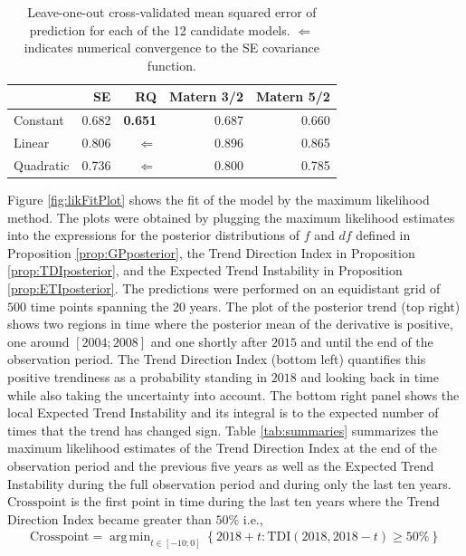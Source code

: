 \documentclass[
  11pt,
]{article}
\theoremstyle{nonumberplain}
\begin{document}
\begin{table}[htbp]
\center
\begin{tabular}{l|rrrr}
 & SE & RQ & Matern 3/2 & Matern 5/2\\ \hline
Constant & 0.682 & \textbf{0.651} & 0.687 & 0.660\\
Linear & 0.806 & $\Leftarrow    $ & 0.896 & 0.865\\
Quadratic & 0.736 & $\Leftarrow$ & 0.800 & 0.785
\end{tabular}
\caption{Leave-one-out cross-validated mean squared error of prediction for each of the 12 candidate models. $\Leftarrow$ indicates numerical convergence to the SE covariance function.}
\label{tab:looTale}
\end{table}

Figure \ref{fig:likFitPlot} shows the fit of the model by the maximum
likelihood method. The plots were obtained by plugging the maximum
likelihood estimates into the expressions for the posterior
distributions of \(f\) and \(df\) defined in Proposition
\ref{prop:GPposterior}, the Trend Direction Index in Proposition
\ref{prop:TDIposterior}, and the Expected Trend Instability in
Proposition \ref{prop:ETIposterior}. The predictions were performed on
an equidistant grid of \(500\) time points spanning the 20 years. The
plot of the posterior trend (top right) shows two regions in time where
the posterior mean of the derivative is positive, one around
\([2004; 2008]\) and one shortly after \(2015\) and until the end of the
observation period. The Trend Direction Index (bottom left) quantifies
this positive trendiness as a probability standing in \(2018\) and
looking back in time while also taking the uncertainty into account. The
bottom right panel shows the local Expected Trend Instability and its
integral is to the expected number of times that the trend has changed
sign. Table \ref{tab:summaries} summarizes the maximum likelihood
estimates of the Trend Direction Index at the end of the observation
period and the previous five years as well as the Expected Trend
Instability during the full observation period and during only the last
ten years. \(\text{Crosspoint}\) is the first point in time during the
last ten years where the Trend Direction Index became greater than
\(50\%\) i.e., \begin{align*}
\text{Crosspoint} = \mathop{\mathrm{arg\,min}}_{t \in [-10; 0]} \left\{2018 + t : \text{TDI}(2018, 2018 - t) \geq 50\%\right\}
\end{align*}
\end{document}
